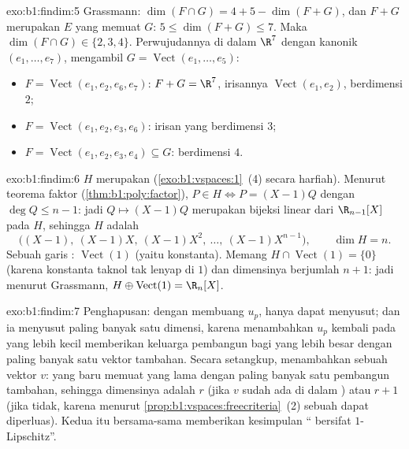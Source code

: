 \begin{solution}{exo:b1:findim:5}
Grassmann: $\dim(F \cap G) = 4 + 5 - \dim(F + G)$, dan $F + G$ merupakan
 $E$ yang memuat $G$: $5 \leq \dim(F+G) \leq 7$. Maka
$\dim(F \cap G) \in \{2, 3, 4\}$. Perwujudannya di dalam $\R^7$ dengan
 kanonik $(e_1, \dots, e_7)$, mengambil $G =
\operatorname{Vect}(e_1, \dots, e_5)$:
\begin{itemize}
  \item $F = \operatorname{Vect}(e_1, e_2, e_6, e_7)$: $F + G = \R^7$,
        irisannya $\operatorname{Vect}(e_1, e_2)$, berdimensi $2$;
  \item $F = \operatorname{Vect}(e_1, e_2, e_3, e_6)$: irisan
        yang berdimensi $3$;
  \item $F = \operatorname{Vect}(e_1, e_2, e_3, e_4) \subseteq G$:
        berdimensi $4$.
\end{itemize}
\end{solution}

\begin{solution}{exo:b1:findim:6}
$H$ merupakan  (\cref{exo:b1:vspaces:1}~(4) secara harfiah). Menurut
teorema faktor (\cref{thm:b1:poly:factor}), $P \in H \iff P =
(X-1)Q$ dengan $\deg Q \leq n - 1$: jadi  $Q \mapsto (X-1)Q$ merupakan
bijeksi linear dari $\R_{n-1}[X]$ pada $H$, sehingga  $H$ adalah
\[
\bigl((X-1),\ (X-1)X,\ (X-1)X^2,\ \dots,\ (X-1)X^{n-1}\bigr),
\qquad \dim H = n .
\]
Sebuah garis : $\operatorname{Vect}(1)$ (yaitu konstanta). Memang
$H \cap \operatorname{Vect}(1) = \{0\}$ (karena konstanta taknol tak
lenyap di $1$) dan dimensinya berjumlah $n + 1$: jadi menurut Grassmann, $H
\oplus \operatorname{Vect}(1) = \R_n[X]$.
\end{solution}

\begin{solution}{exo:b1:findim:7}
Penghapusan: dengan membuang $u_p$,  hanya dapat menyusut; dan ia menyusut
paling banyak satu dimensi, karena menambahkan $u_p$ kembali pada 
 yang lebih kecil memberikan keluarga pembangun bagi yang lebih besar dengan paling
banyak satu vektor tambahan. Secara setangkup, menambahkan sebuah vektor $v$: 
yang baru memuat yang lama dengan paling banyak satu pembangun tambahan, sehingga
dimensinya adalah $r$ (jika $v$ sudah ada di dalam ) atau $r + 1$
(jika tidak, karena menurut \cref{prop:b1:vspaces:freecriteria}~(2) sebuah 
dapat diperluas). Kedua  itu bersama-sama memberikan kesimpulan ``
bersifat $1$-Lipschitz''.
\end{solution}

